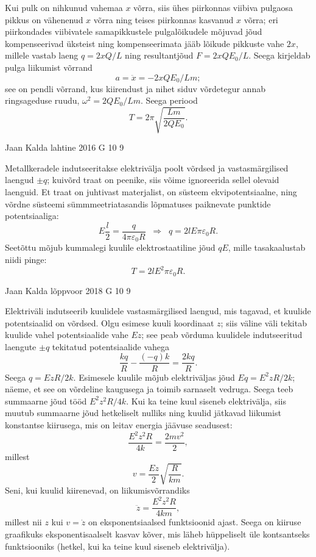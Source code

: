\documentclass[11pt]{article}
\begin{document}
{{\osa Kui pulk on nihkunud vahemaa $x$ võrra, siis ühes piirkonnas viibiva pulgaosa pikkus
on vähenenud $x$ võrra ning teises piirkonnas kasvanud $x$ võrra; eri piirkondades viibivatele
samapikkustele pulgalõikudele mõjuvad jõud kompenseerivad üksteist ning kompenseerimata jääb lõikude pikkuste vahe $2x$, millele vastab laeng
$q=2xQ/L$ ning resultantjõud $F=2xQE_0/L$.
Seega kirjeldab pulga liikumist võrrand
\[
a=\ddot x= -2xQE_0/Lm;
\]
see on pendli võrrand, kus kiirendust ja nihet siduv võrdetegur annab ringsageduse ruudu,
$\omega^2=2QE_0/Lm$. Seega periood 
\[ T=2\pi\sqrt{\frac{Lm}{2QE_0}}.\]
\fi
}

{Jaan Kalda} %
{lahtine} %
{2016} %
{G 10} %
{9} %
{

\ifSolution
Metallkeradele indutseeritakse elektrivälja poolt võrdsed ja vastasmärgilised laengud $\pm q$; kuivõrd traat on peenike,
siis võime ignoreerida sellel olevaid laenguid. Et traat on juhtivast materjalist, on süsteem ekvipotentsiaalne,
ning võrdne süsteemi sümmmeetriatasandis lõpmatuses paiknevate punktide potentsiaaliga:
$$E\frac l2=\frac q{4\pi\varepsilon_0R}\;\;\Rightarrow\;\; q=2lE\pi\varepsilon_0R.$$
Seetõttu mõjub kummalegi kuulile elektrostaatiline jõud $qE$, mille tasakaalustab niidi pinge:
$$T=2lE^2\pi\varepsilon_0R.$$
\fi
}

{Jaan Kalda} %
{lõppvoor} %
{2018} %
{G 10} %
{9} %
{

\ifSolution
Elektriväli indutseerib kuulidele vastasmärgilised laengud, mis tagavad, et kuulide potentsiaalid on võrdsed. Olgu esimese kuuli koordinaat $z$; siis väline väli tekitab kuulide vahel potentsiaalide vahe $Ez$; see peab võrduma kuulidele indutseeritud laengute $\pm q$ tekitatud potentsiaalide vahega
\[
\frac{kq}{R}-\frac{(-q)k}{R}=\frac{2kq}{R}.
\]
Seega $q=EzR/2k$. Esimesele kuulile mõjub elektriväljas jõud $Eq=E^2zR/2k$; näeme, et see on võrdeline kaugusega ja toimib sarnaselt vedruga. Seega teeb summaarne jõud tööd $E^2z^2R/4k$. Kui ka teine kuul siseneb elektrivälja, siis muutub summaarne jõud hetkeliselt nulliks ning kuulid jätkavad liikumist konstantse kiirusega, mis on leitav energia jäävuse seadusest: 
\[
\frac{E^2z^2R}{4k}=\frac{2mv^2}{2},
\]
millest
\[
v=\frac{Ez}{2}\sqrt{\frac{R}{km}}.
\]
Seni, kui kuulid kiirenevad, on liikumisvõrrandiks
\[
\ddot z=\frac{E^2z^2R}{4km},
\]
millest nii $z$ kui $v=\dot z$ on eksponentsiaalsed funktsioonid ajast. Seega on kiiruse graafikuks eksponentisaalselt kasvav kõver, mis läheb hüppeliselt üle kontsantseks funktsiooniks (hetkel, kui ka teine kuul siseneb elektrivälja).
\fi
}

}
\end{document}
